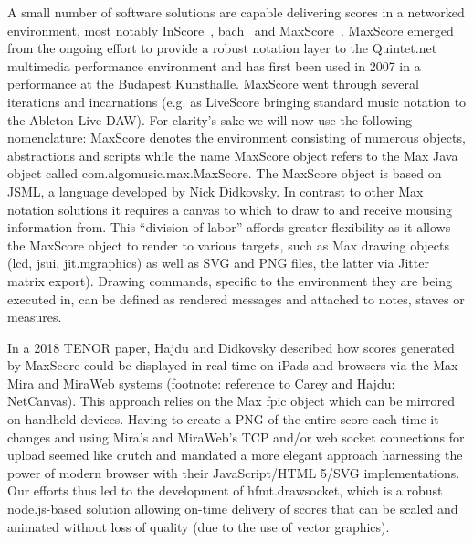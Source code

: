 A small number of software solutions are capable delivering scores in a networked environment, most notably InScore~\cite{fober2013programming}, bach~\cite{agostini2015max} and MaxScore~\cite{didkovsky2008maxscore}. MaxScore emerged from the ongoing effort to provide a robust notation layer to the Quintet.net multimedia performance environment and has first been used in 2007 in a performance at the Budapest Kunsthalle. MaxScore went through several iterations and incarnations (e.g. as LiveScore bringing standard music notation to the Ableton Live DAW).
For clarity’s sake we will now use the following nomenclature: MaxScore denotes the environment consisting of numerous objects, abstractions and scripts while the name MaxScore object refers to the Max Java object called \linebreak com.algomusic.max.MaxScore. The MaxScore object is based on JSML, a language developed by Nick Didkovsky. In contrast to other Max notation solutions it requires a canvas to which to draw to and receive mousing information from. This “division of labor” affords greater flexibility as it allows the MaxScore object to render to various targets, such as Max drawing objects (lcd, jsui, jit.mgraphics) as well as SVG and PNG files, the latter via Jitter matrix export). Drawing commands, specific to the environment they are being executed in, can be defined as rendered messages and attached to notes, staves or measures. 

In a 2018 TENOR paper, Hajdu and Didkovsky described how scores generated by MaxScore could be displayed in real-time on iPads and browsers via the Max Mira and MiraWeb systems (footnote: reference to Carey and Hajdu: NetCanvas). This approach relies on the Max fpic object which can be mirrored on handheld devices. Having to create a PNG of the entire score each time it changes and using Mira’s and MiraWeb’s TCP and/or web socket connections for upload seemed like crutch and mandated a more elegant approach harnessing the power of modern browser with their JavaScript/HTML 5/SVG implementations. Our efforts thus led to the development of hfmt.drawsocket, which is a robust node.js-based solution allowing on-time delivery of scores that can be scaled and animated without loss of quality (due to the use of vector graphics). 






